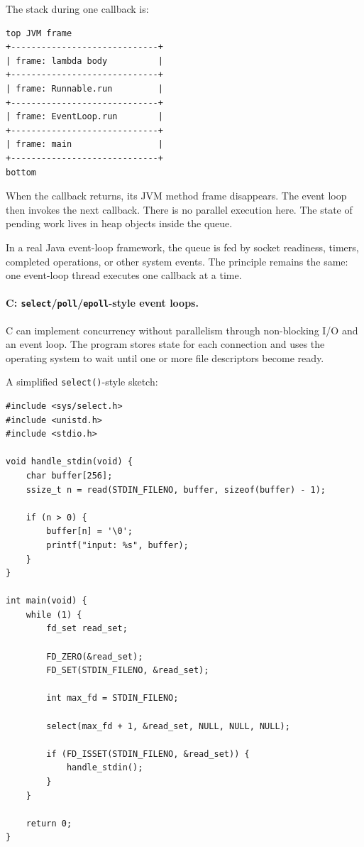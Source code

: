 The stack during one callback is:

\begin{verbatim}
top JVM frame
+-----------------------------+
| frame: lambda body          |
+-----------------------------+
| frame: Runnable.run         |
+-----------------------------+
| frame: EventLoop.run        |
+-----------------------------+
| frame: main                 |
+-----------------------------+
bottom
\end{verbatim}

When the callback returns, its JVM method frame disappears. The event loop then invokes the next callback. There is no parallel execution here. The state of pending work lives in heap objects inside the queue.

In a real Java event-loop framework, the queue is fed by socket readiness, timers, completed operations, or other system events. The principle remains the same: one event-loop thread executes one callback at a time.

\paragraph{C: \texttt{select}/\texttt{poll}/\texttt{epoll}-style event loops.}

C can implement concurrency without parallelism through non-blocking I/O and an event loop. The program stores state for each connection and uses the operating system to wait until one or more file descriptors become ready.

A simplified \texttt{select()}-style sketch:

\begin{verbatim}
#include <sys/select.h>
#include <unistd.h>
#include <stdio.h>

void handle_stdin(void) {
    char buffer[256];
    ssize_t n = read(STDIN_FILENO, buffer, sizeof(buffer) - 1);

    if (n > 0) {
        buffer[n] = '\0';
        printf("input: %s", buffer);
    }
}

int main(void) {
    while (1) {
        fd_set read_set;

        FD_ZERO(&read_set);
        FD_SET(STDIN_FILENO, &read_set);

        int max_fd = STDIN_FILENO;

        select(max_fd + 1, &read_set, NULL, NULL, NULL);

        if (FD_ISSET(STDIN_FILENO, &read_set)) {
            handle_stdin();
        }
    }

    return 0;
}
\end{verbatim}

